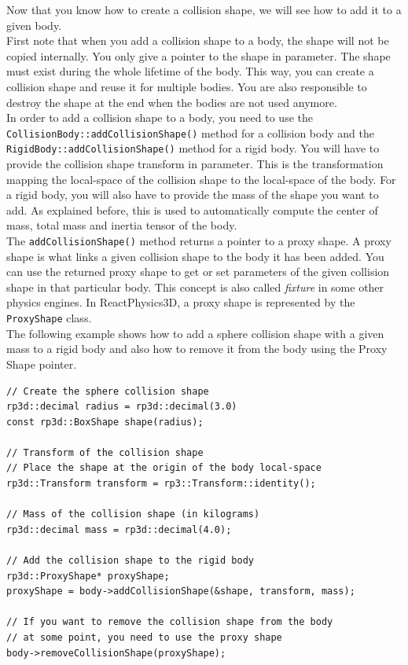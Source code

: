 \documentclass[a4paper,12pt]{article}
\begin{document}
    \begin{sloppypar}
    Now that you know how to create a collision shape, we will see how to add it to a given body. \\

    First note that when you add a collision shape to a body, the shape will not be copied internally. You only give a
    pointer to the shape in parameter. The shape must exist during the whole lifetime of the body. This way, you can
    create a collision shape and reuse it for multiple bodies. You are also responsible to destroy the shape at the
    end when the bodies are not used anymore. \\

   In order to add a collision shape to a body, you need to use the \texttt{CollisionBody::addCollisionShape()} method for a collision body and the
   \texttt{RigidBody::addCollisionShape()} method for a rigid body. You will have to provide the collision shape transform in parameter. This is the
   transformation mapping the local-space of the collision shape to the local-space of the body. For a rigid body, you will also have to provide the
   mass of the shape you want to add. As explained before, this is used to automatically compute the center of mass, total mass and inertia tensor of the body. \\

   The \texttt{addCollisionShape()} method returns a pointer to a proxy shape. A proxy shape is what links a given collision shape to the body it has been added.
   You can use the returned proxy shape to get or set parameters of the given collision shape in that particular body. This concept is also called \emph{fixture} in some
   other physics engines. In ReactPhysics3D, a proxy shape is represented by the \texttt{ProxyShape} class. \\

    The following example shows how to add a sphere collision shape with a given mass to a rigid body and also how to remove it from the body using the Proxy Shape pointer. \\
    \end{sloppypar}

    \begin{lstlisting}
// Create the sphere collision shape
rp3d::decimal radius = rp3d::decimal(3.0)
const rp3d::BoxShape shape(radius);

// Transform of the collision shape
// Place the shape at the origin of the body local-space
rp3d::Transform transform = rp3::Transform::identity();

// Mass of the collision shape (in kilograms)
rp3d::decimal mass = rp3d::decimal(4.0);

// Add the collision shape to the rigid body
rp3d::ProxyShape* proxyShape;
proxyShape = body->addCollisionShape(&shape, transform, mass);

// If you want to remove the collision shape from the body
// at some point, you need to use the proxy shape
body->removeCollisionShape(proxyShape);
  \end{lstlisting}
\end{document}
